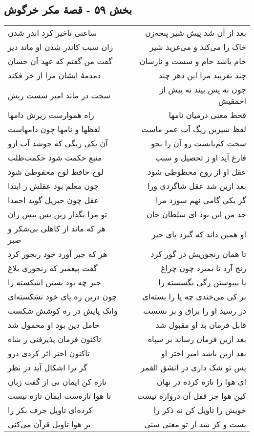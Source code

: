 \begin{center}
\section*{بخش ۵۹ - قصهٔ مکر خرگوش}
\label{sec:sh059}
\begin{longtable}{l p{0.5cm} r}
ساعتی تاخیر کرد اندر شدن
&&
بعد از آن شد پیش شیر پنجه‌زن
\\
زان سبب کاندر شدن او ماند دیر
&&
خاک را می‌کند و می‌غرید شیر
\\
گفت من گفتم که عهد آن خسان
&&
خام باشد خام و سست و نارسان
\\
دمدمهٔ ایشان مرا از خر فکند
&&
چند بفریبد مرا این دهر چند
\\
سخت در ماند امیر سست ریش
&&
چون نه پس بیند نه پیش از احمقیش
\\
راه هموارست زیرش دامها
&&
قحط معنی درمیان نامها
\\
لفظها و نامها چون دامهاست
&&
لفظ شیرین ریگ آب عمر ماست
\\
آن یکی ریگی که جوشد آب ازو
&&
سخت کم‌یابست رو آن را بجو
\\
منبع حکمت شود حکمت‌طلب
&&
فارغ آید او ز تحصیل و سبب
\\
لوح حافظ لوح محفوظی شود
&&
عقل او از روح محظوظی شود
\\
چون معلم بود عقلش ز ابتدا
&&
بعد ازین شد عقل شاگردی ورا
\\
عقل چون جبریل گوید احمدا
&&
گر یکی گامی نهم سوزد مرا
\\
تو مرا بگذار زین پس پیش ران
&&
حد من این بود ای سلطان جان
\\
هر که ماند از کاهلی بی‌شکر و صبر
&&
او همین داند که گیرد پای جبر
\\
هر که جبر آورد خود رنجور کرد
&&
تا همان رنجوریش در گور کرد
\\
گفت پیغمبر که رنجوری بلاغ
&&
رنج آرد تا بمیرد چون چراغ
\\
جبر چه بود بستن اشکسته را
&&
یا بپیوستن رگی بگسسته را
\\
چون درین ره پای خود نشکسته‌ای
&&
بر کی می‌خندی چه پا را بسته‌ای
\\
وانک پایش در ره کوشش شکست
&&
در رسید او را براق و بر نشست
\\
حامل دین بود او محمول شد
&&
قابل فرمان بد او مقبول شد
\\
تاکنون فرمان پذیرفتی ز شاه
&&
بعد ازین فرمان رساند بر سپاه
\\
تاکنون اختر اثر کردی درو
&&
بعد ازین باشد امیر اختر او
\\
گر ترا اشکال آید در نظر
&&
پس تو شک داری در انشق القمر
\\
تازه کن ایمان نی از گفت زبان
&&
ای هوا را تازه کرده در نهان
\\
تا هوا تازه‌ست ایمان تازه نیست
&&
کین هوا جز قفل آن دروازه نیست
\\
کرده‌ای تاویل حرف بکر را
&&
خویش را تاویل کن نه ذکر را
\\
بر هوا تاویل قرآن می‌کنی
&&
پست و کژ شد از تو معنی سنی
\\
\end{longtable}
\end{center}
